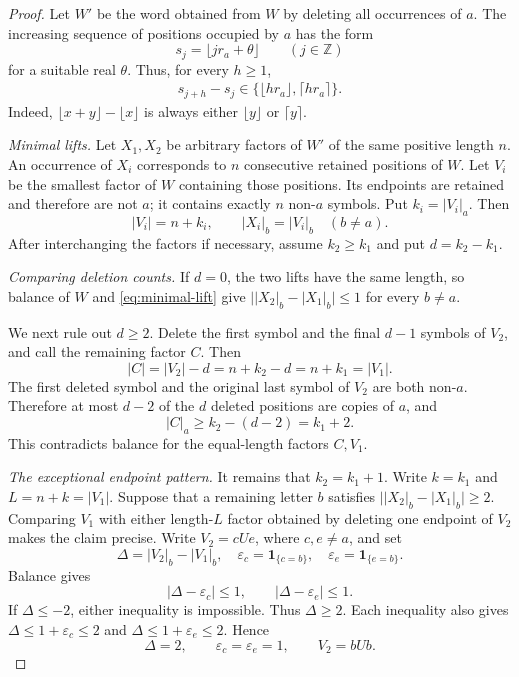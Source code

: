 \documentclass[11pt]{article}
\theoremstyle{definition}
\theoremstyle{remark}
\newcommand{\Z}{\mathbb Z}
\begin{document}
\begin{proof}
Let \(W'\) be the word obtained from \(W\) by deleting all occurrences of
\(a\).  The increasing sequence of positions occupied by \(a\) has the
form
\[
 s_j=\lfloor jr_a+\theta\rfloor\qquad(j\in\Z)
\]
for a suitable real \(\theta\).  Thus, for every \(h\ge1\),
\begin{equation}\label{eq:beatty-gaps}
 \begin{aligned}
 s_{j+h}-s_j\in\{\lfloor hr_a\rfloor,\lceil hr_a\rceil\}.
 \end{aligned}
\end{equation}
Indeed, \(\lfloor x+y\rfloor-\lfloor x\rfloor\) is always either
\(\lfloor y\rfloor\) or \(\lceil y\rceil\).

\smallskip
\noindent\emph{Minimal lifts.}
Let \(X_1,X_2\) be arbitrary factors of \(W'\) of the same positive
length \(n\).  An occurrence of \(X_i\) corresponds to \(n\) consecutive
retained positions of \(W\).  Let \(V_i\) be the smallest factor of \(W\)
containing those positions.  Its endpoints are retained and therefore are
not \(a\); it contains exactly \(n\) non-\(a\) symbols.  Put
\(k_i=|V_i|_a\).  Then
\begin{equation}\label{eq:minimal-lift}
 |V_i|=n+k_i,
 \qquad |X_i|_b=|V_i|_b\quad(b\ne a).
\end{equation}
After interchanging the factors if necessary, assume \(k_2\ge k_1\) and
put \(d=k_2-k_1\).

\smallskip
\noindent\emph{Comparing deletion counts.}
If \(d=0\), the two lifts have the same length, so balance of \(W\) and
\eqref{eq:minimal-lift} give
\(\bigl||X_2|_b-|X_1|_b\bigr|\le1\) for every \(b\ne a\).

We next rule out \(d\ge2\).  Delete the first symbol and the final
\(d-1\) symbols of \(V_2\), and call the remaining factor \(C\).  Then
\[
 |C|=|V_2|-d=n+k_2-d=n+k_1=|V_1|.
\]
The first deleted symbol and the original last symbol of \(V_2\) are both
non-\(a\).  Therefore at most \(d-2\) of the \(d\) deleted positions are
copies of \(a\), and
\[
 |C|_a\ge k_2-(d-2)=k_1+2.
\]
This contradicts balance for the equal-length factors \(C,V_1\).

\smallskip
\noindent\emph{The exceptional endpoint pattern.}
It remains that \(k_2=k_1+1\).  Write \(k=k_1\) and
\(L=n+k=|V_1|\).  Suppose that a remaining letter \(b\) satisfies
\(\lvert |X_2|_b-|X_1|_b\rvert\ge2\).  Comparing \(V_1\) with either
length-\(L\) factor obtained by deleting one endpoint of \(V_2\) makes the
claim precise.  Write \(V_2=cUe\), where \(c,e\ne a\), and set
\[
 \Delta=|V_2|_b-|V_1|_b,
 \quad \varepsilon_c=\mathbf1_{\{c=b\}},
 \quad \varepsilon_e=\mathbf1_{\{e=b\}}.
\]
Balance gives
\begin{equation}\label{eq:endpoint-comparisons}
 |\Delta-\varepsilon_c|\le1,
 \qquad |\Delta-\varepsilon_e|\le1.
\end{equation}
If \(\Delta\le-2\), either inequality is impossible.  Thus
\(\Delta\ge2\).  Each inequality also gives
\(\Delta\le1+\varepsilon_c\le2\) and
\(\Delta\le1+\varepsilon_e\le2\).  Hence
\[
 \Delta=2,
 \qquad \varepsilon_c=\varepsilon_e=1,
 \qquad V_2=bUb.
\]


\end{proof}
\end{document}
